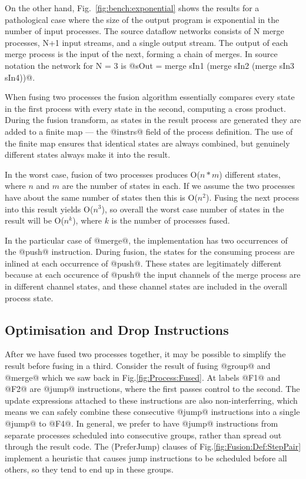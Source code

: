 On the other hand, Fig.~\ref{fig:bench:exponential} shows the results for a pathological case where the size of the output program is exponential in the number of input processes. The source dataflow networks consists of N merge processes, N+1 input streams, and a single output stream. The output of each merge process is the input of the next, forming a chain of merges. In source notation the network for N = 3 is @sOut = merge sIn1 (merge sIn2 (merge sIn3 sIn4))@.

When fusing two processes the fusion algorithm essentially compares every state in the first process with every state in the second, computing a cross product. During the fusion transform, as states in the result process are generated they are added to a finite map --- the @instrs@ field of the process definition. The use of the finite map ensures that identical states are always combined, but genuinely different states always make it into the result. 

In the worst case, fusion of two processes produces O($n*m$) different states, where $n$ and $m$ are the number of states in each. If we assume the two processes have about the same number of states then this is O($n^2$). Fusing the next process into this result yields O($n^3$), so overall the worst case number of states in the result will be O($n^k$), where $k$ is the number of processes fused. 

In the particular case of @merge@, the implementation has two occurrences of the @push@ instruction. During fusion, the states for the consuming process are inlined at each occurrence of @push@. These states are legitimately different because at each occurence of @push@ the input channels of the merge process are in different channel states, and these channel states are included in the overall process state.


\subsection{Optimisation and Drop Instructions}
\label{s:Optimisation}
After we have fused two processes together, it may be possible to simplify the result before fusing in a third. Consider the result of fusing @group@ and @merge@ which we saw back in Fig.\ref{fig:Process:Fused}. At labels @F1@ and @F2@ are @jump@ instructions, where the first passes control to the second. The update expressions attached to these instructions are also non-interferring, which means we can safely combine these consecutive @jump@ instructions into a single @jump@ to @F4@. In general, we prefer to have @jump@ instructions from separate processes scheduled into consecutive groups, rather than spread out through the result code. The (PreferJump) clauses of Fig.\ref{fig:Fusion:Def:StepPair} implement a heuristic that causes jump instructions to be scheduled before all others, so they tend to end up in these groups.

